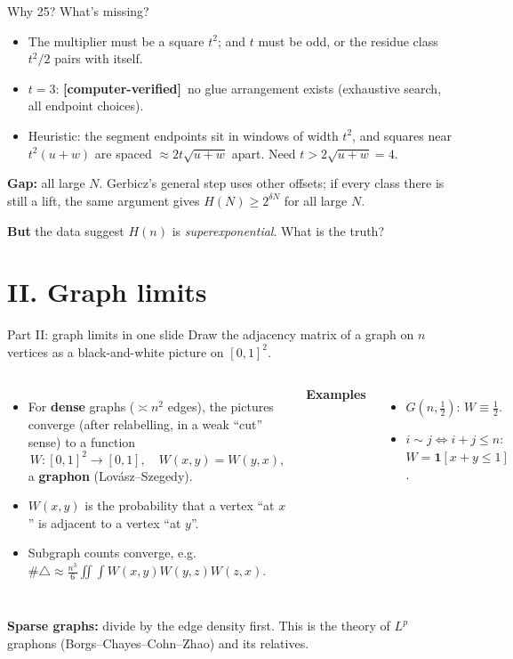 \documentclass[11pt,aspectratio=169]{beamer}
\newcommand{\Ham}{H}
\newcommand{\computed}{\textcolor{blue!70!black}{\textbf{[computer-verified]}}}
\begin{document}
\begin{frame}{Why 25? \quad What's missing?}
\begin{itemize}
\item The multiplier must be a square $t^2$; and $t$ must be odd, or the residue class
 $t^2/2$ pairs with itself.
\item $t=3$: \computed\ no glue arrangement exists (exhaustive search, all
 endpoint choices).
\item Heuristic: the segment endpoints sit in windows of width $t^2$, and squares near
 $t^2(u+w)$ are spaced $\approx 2t\sqrt{u+w}$ apart. Need $t>2\sqrt{u+w}=4$.
\end{itemize}
\medskip
\textbf{Gap:} all large $N$. Gerbicz's general step uses other offsets; if every class
there is still a lift, the same argument gives $\Ham(N)\ge 2^{\delta N}$ for all large $N$.

\pause
\medskip
\textbf{But} the data suggest $\Ham(n)$ is \emph{superexponential}. What is the truth?
\end{frame}

\section{II. Graph limits}
\begin{frame}{Part II: graph limits in one slide}
\small
Draw the adjacency matrix of a graph on $n$ vertices as a black-and-white picture on $[0,1]^2$.

\medskip
\begin{columns}
\begin{itemize}
\item For \textbf{dense} graphs ($\asymp n^2$ edges), the pictures converge (after
 relabelling, in a weak ``cut'' sense) to a function
 \[ W:[0,1]^2\to[0,1],\quad W(x,y)=W(y,x),\]
 a \textbf{graphon} (Lovász--Szegedy).
\item $W(x,y)$ is the probability that a vertex ``at $x$'' is adjacent to a vertex ``at $y$''.
\item Subgraph counts converge, e.g.\ $\#\triangle\approx\frac{n^3}{6}\iint\!\!\int W(x,y)W(y,z)W(z,x)$.
\end{itemize}
\textbf{Examples}
\begin{itemize}
\item $G(n,\tfrac12)$: $W\equiv\tfrac12$.
\item $i\sim j\iff i+j\le n$: $W=\mathbf 1[x+y\le1]$.
\end{itemize}
\end{columns}
\medskip
\textbf{Sparse graphs:} divide by the edge density first. This is the theory of
$L^p$ graphons (Borgs--Chayes--Cohn--Zhao) and its relatives.
\end{frame}
\end{document}
